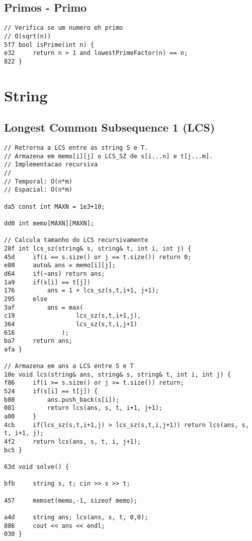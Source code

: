 \documentclass[11pt, a4paper, twoside]{article}
\begin{document}
\subsection{Primos - Primo}
\begin{lstlisting}
// Verifica se um numero eh primo
// O(sqrt(n))
5f7 bool isPrime(int n) {
e32     return n > 1 and lowestPrimeFactor(n) == n;
822 }
\end{lstlisting}



%
%

\section{String}

\subsection{Longest Common Subsequence 1 (LCS)}
\begin{lstlisting}
// Retrorna a LCS entre as string S e T.
// Armazena em memo[i][j] o LCS_SZ de s[i...n] e t[j...m].
// Implementacao recursiva
//
// Temporal: O(n*m)
// Espacial: O(n*m)

da5 const int MAXN = 1e3+10;

dd0 int memo[MAXN][MAXN];

// Calcula tamanho do LCS recursivamente
28f int lcs_sz(string& s, string& t, int i, int j) {
45d 	if(i == s.size() or j == t.size()) return 0;
e80 	auto& ans = memo[i][j];
d64 	if(~ans) return ans;
1a9 	if(s[i] == t[j])
176 		ans = 1 + lcs_sz(s,t,i+1, j+1);
295 	else
3af 		ans = max(
c19 				lcs_sz(s,t,i+1,j),
364 				lcs_sz(s,t,i,j+1)
616 			);
ba7 	return ans;
afa }

// Armazena em ans a LCS entre S e T
10e void lcs(string& ans, string& s, string& t, int i, int j) {
f86 	if(i >= s.size() or j >= t.size()) return;
524 	if(s[i] == t[j]) {
b80 		ans.push_back(s[i]);
081 		return lcs(ans, s, t, i+1, j+1);
a00 	}
4cb 	if(lcs_sz(s,t,i+1,j) > lcs_sz(s,t,i,j+1)) return lcs(ans, s, t, i+1, j);
4f2 	return lcs(ans, s, t, i, j+1);
bc5 }

63d void solve() {
    
bfb 	string s, t; cin >> s >> t;
    	
457 	memset(memo,-1, sizeof memo);
    
a4d 	string ans; lcs(ans, s, t, 0,0);
886 	cout << ans << endl;
030 }

\end{lstlisting}
\end{document}
